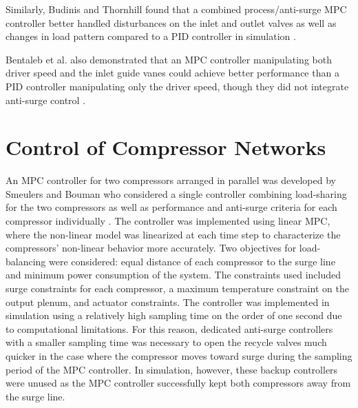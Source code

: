 Similarly, Budinis and Thornhill found that a combined process/anti-surge MPC controller better handled disturbances on the inlet and outlet valves as well as changes in load pattern compared to a PID controller in simulation \cite{Budinis2015}.

Bentaleb et al. also demonstrated that an MPC controller manipulating both driver speed and the inlet guide vanes could achieve better performance than a PID controller manipulating only the driver speed, though they did not integrate anti-surge control \cite{Bentaleb2014}.



\section{Control of Compressor Networks}

An MPC controller for two compressors arranged in parallel was developed by Smeulers and Bouman who considered a single controller combining load-sharing for the two compressors as well as performance and anti-surge criteria for each compressor individually \cite{Smeulers1999}. 
The controller was implemented using linear MPC, where the non-linear model was linearized at each time step to characterize the compressors' non-linear behavior more accurately.
Two objectives for load-balancing were considered: equal distance of each compressor to the surge line and minimum power consumption of the system. 
The constraints used included surge constraints for each compressor, a maximum temperature constraint on the output plenum, and actuator constraints.
The controller was implemented in simulation using a relatively high sampling time on the order of one second due to computational limitations. 
For this reason, dedicated anti-surge controllers with a smaller sampling time was necessary to open the recycle valves much quicker in the case where the compressor moves toward surge during the sampling period of the MPC controller. 
In simulation, however, these backup controllers were unused as the MPC controller successfully kept both compressors away from the surge line.

